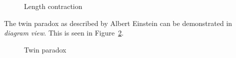 \documentclass{egpubl}
\begin{document}
\begin{figure}[h]
\center
{}
\caption{Length contraction}
\label{fig:lengthContraction}
\end{figure}

The twin paradox as described by Albert Einstein can be demonstrated in \emph{diagram view}. This is seen in Figure~\ref{fig:twinParadox}.

\begin{figure}[h]
\center
{}
\caption{Twin paradox}
\label{fig:twinParadox}
\end{figure}
\end{document}
